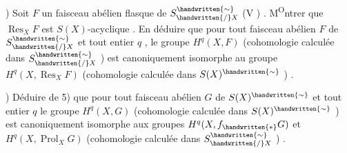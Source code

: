 ) Soit \(F\) un faisceau abélien flasque de \(S^{\handwritten{\sim}}_{\handwritten{/}X}\) (V ) . M\textsuperscript{O}ntrer que \(\operatorname{Res}_X F\) est \(S(X)\)-acyclique%
\reversemarginpar{}\normalmarginpar . En déduire que pour tout faisceau abélien \(F\) de \(S^{\handwritten{\sim}}_{\handwritten{/}X}\) et tout entier \(q\) , le groupe \(H^q(X,F)\) (cohomologie calculée dans \(S^{\handwritten{\sim}}_{\handwritten{/}X}\) ) est canoniquement isomorphe au groupe \(H^q(X,\operatorname{Res}_X F)\) (cohomologie calculée dans \(S(X)^{\handwritten{\sim}}\) ) .

) Déduire de 5) que pour tout faisceau abélien \(G\)  de \(S(X)^{\handwritten{\sim}}\) et tout entier \(q\) le groupe \(H^q(X,G)\)  (cohomologie calculée dans \(S(X)^{\handwritten{\sim}}\) ) est canoniquement isomorphe aux groupes \(H^q(X,f_{\handwritten{*}}G)\) et \(H^q(X,\operatorname{Prol}_X G)\) (cohomologie calculée dans \(S^{\handwritten{\sim}}_{\handwritten{/}X}\) ) .
